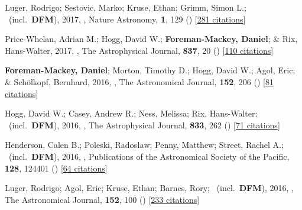 \item[{\color{numcolor}\scriptsize26}] Luger, Rodrigo; Sestovic, Marko; Kruse, Ethan; Grimm, Simon L.; \etal\ (incl.\ \textbf{DFM}), 2017, , Nature Astronomy, \textbf{1}, 129 () [\href{https://ui.adsabs.harvard.edu/abs/2017NatAs...1E.129L}{281 citations}]

\item[{\color{numcolor}\scriptsize25}] Price-Whelan, Adrian M.; Hogg, David W.; \textbf{Foreman-Mackey, Daniel}; \& Rix, Hans-Walter, 2017, , The Astrophysical Journal, \textbf{837}, 20 () [\href{https://ui.adsabs.harvard.edu/abs/2017ApJ...837...20P}{110 citations}]

\item[{\color{numcolor}\scriptsize24}] \textbf{Foreman-Mackey, Daniel}; Morton, Timothy D.; Hogg, David W.; Agol, Eric; \& Sch{\"o}lkopf, Bernhard, 2016, , The Astronomical Journal, \textbf{152}, 206 () [\href{https://ui.adsabs.harvard.edu/abs/2016AJ....152..206F}{81 citations}]

\item[{\color{numcolor}\scriptsize23}] Hogg, David W.; Casey, Andrew R.; Ness, Melissa; Rix, Hans-Walter; \etal\ (incl.\ \textbf{DFM}), 2016, , The Astrophysical Journal, \textbf{833}, 262 () [\href{https://ui.adsabs.harvard.edu/abs/2016ApJ...833..262H}{71 citations}]

\item[{\color{numcolor}\scriptsize22}] Henderson, Calen B.; Poleski, Rados{\l}aw; Penny, Matthew; Street, Rachel A.; \etal\ (incl.\ \textbf{DFM}), 2016, , Publications of the Astronomical Society of the Pacific, \textbf{128}, 124401 () [\href{https://ui.adsabs.harvard.edu/abs/2016PASP..128l4401H}{64 citations}]

\item[{\color{numcolor}\scriptsize21}] Luger, Rodrigo; Agol, Eric; Kruse, Ethan; Barnes, Rory; \etal\ (incl.\ \textbf{DFM}), 2016, , The Astronomical Journal, \textbf{152}, 100 () [\href{https://ui.adsabs.harvard.edu/abs/2016AJ....152..100L}{233 citations}]

